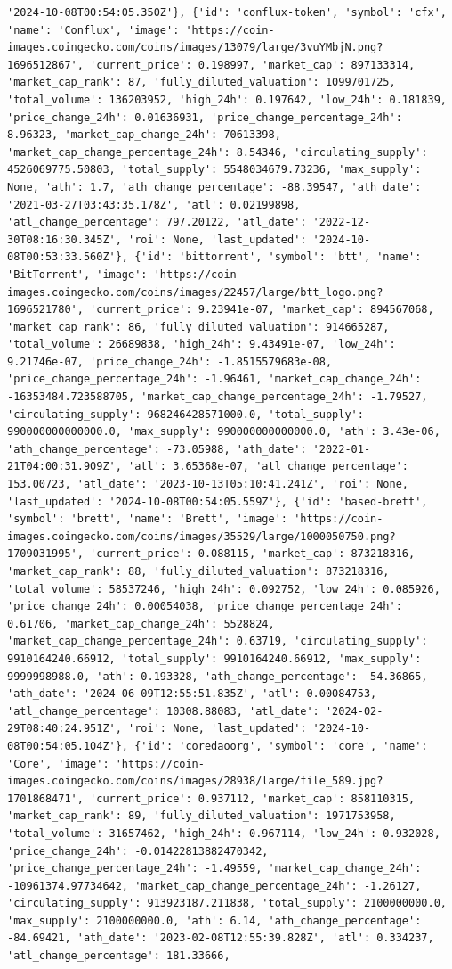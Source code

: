 \documentclass[
  letterpaper,
  DIV=11,
  numbers=noendperiod]{scrreprt}
\begin{document}
\begin{verbatim}
'2024-10-08T00:54:05.350Z'}, {'id': 'conflux-token', 'symbol': 'cfx', 'name': 'Conflux', 'image': 'https://coin-images.coingecko.com/coins/images/13079/large/3vuYMbjN.png?1696512867', 'current_price': 0.198997, 'market_cap': 897133314, 'market_cap_rank': 87, 'fully_diluted_valuation': 1099701725, 'total_volume': 136203952, 'high_24h': 0.197642, 'low_24h': 0.181839, 'price_change_24h': 0.01636931, 'price_change_percentage_24h': 8.96323, 'market_cap_change_24h': 70613398, 'market_cap_change_percentage_24h': 8.54346, 'circulating_supply': 4526069775.50803, 'total_supply': 5548034679.73236, 'max_supply': None, 'ath': 1.7, 'ath_change_percentage': -88.39547, 'ath_date': '2021-03-27T03:43:35.178Z', 'atl': 0.02199898, 'atl_change_percentage': 797.20122, 'atl_date': '2022-12-30T08:16:30.345Z', 'roi': None, 'last_updated': '2024-10-08T00:53:33.560Z'}, {'id': 'bittorrent', 'symbol': 'btt', 'name': 'BitTorrent', 'image': 'https://coin-images.coingecko.com/coins/images/22457/large/btt_logo.png?1696521780', 'current_price': 9.23941e-07, 'market_cap': 894567068, 'market_cap_rank': 86, 'fully_diluted_valuation': 914665287, 'total_volume': 26689838, 'high_24h': 9.43491e-07, 'low_24h': 9.21746e-07, 'price_change_24h': -1.8515579683e-08, 'price_change_percentage_24h': -1.96461, 'market_cap_change_24h': -16353484.723588705, 'market_cap_change_percentage_24h': -1.79527, 'circulating_supply': 968246428571000.0, 'total_supply': 990000000000000.0, 'max_supply': 990000000000000.0, 'ath': 3.43e-06, 'ath_change_percentage': -73.05988, 'ath_date': '2022-01-21T04:00:31.909Z', 'atl': 3.65368e-07, 'atl_change_percentage': 153.00723, 'atl_date': '2023-10-13T05:10:41.241Z', 'roi': None, 'last_updated': '2024-10-08T00:54:05.559Z'}, {'id': 'based-brett', 'symbol': 'brett', 'name': 'Brett', 'image': 'https://coin-images.coingecko.com/coins/images/35529/large/1000050750.png?1709031995', 'current_price': 0.088115, 'market_cap': 873218316, 'market_cap_rank': 88, 'fully_diluted_valuation': 873218316, 'total_volume': 58537246, 'high_24h': 0.092752, 'low_24h': 0.085926, 'price_change_24h': 0.00054038, 'price_change_percentage_24h': 0.61706, 'market_cap_change_24h': 5528824, 'market_cap_change_percentage_24h': 0.63719, 'circulating_supply': 9910164240.66912, 'total_supply': 9910164240.66912, 'max_supply': 9999998988.0, 'ath': 0.193328, 'ath_change_percentage': -54.36865, 'ath_date': '2024-06-09T12:55:51.835Z', 'atl': 0.00084753, 'atl_change_percentage': 10308.88083, 'atl_date': '2024-02-29T08:40:24.951Z', 'roi': None, 'last_updated': '2024-10-08T00:54:05.104Z'}, {'id': 'coredaoorg', 'symbol': 'core', 'name': 'Core', 'image': 'https://coin-images.coingecko.com/coins/images/28938/large/file_589.jpg?1701868471', 'current_price': 0.937112, 'market_cap': 858110315, 'market_cap_rank': 89, 'fully_diluted_valuation': 1971753958, 'total_volume': 31657462, 'high_24h': 0.967114, 'low_24h': 0.932028, 'price_change_24h': -0.01422813882470342, 'price_change_percentage_24h': -1.49559, 'market_cap_change_24h': -10961374.97734642, 'market_cap_change_percentage_24h': -1.26127, 'circulating_supply': 913923187.211838, 'total_supply': 2100000000.0, 'max_supply': 2100000000.0, 'ath': 6.14, 'ath_change_percentage': -84.69421, 'ath_date': '2023-02-08T12:55:39.828Z', 'atl': 0.334237, 'atl_change_percentage': 181.33666, 
\end{verbatim}
\end{document}
